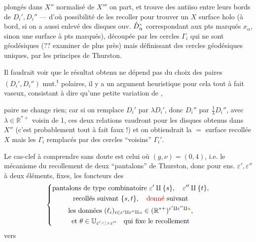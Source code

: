 plongés dans $X''$ normalisé de $X'''$  on
part, et  trouve des antiiso entre
leurs bords  de $D_i',D_i''$ ---
d'où possibilité de les recoller pour
trouver un $X$ surface holo (à bord,
si on a aussi enlevé des disques ouv.
$\mathring D_\alpha^{\unsure{*}}$ correspondant aux pts marqués $x_\alpha$,
sinon une surface à pts marqués),
découpée par les cercles $\Gamma_i$ qui ne
sont   géodésiques
($??$ 
examiner de plus près) mais définissant
des cercles géodésiques uniques,
par les principes de Thurston.

Il faudrait voir que le résultat
obtenu ne dépend pas du choix des
paires $(D_i',D_i'')$ mut.\textsuperscript{t} polaires, il y
a un argument heuristique pour
cela tout à fait vaseux, consistant
à dire qu'une petite variation de ,

paire ne change rien; car si on remplace
$D_i'$ par $\lambda D_i'$, donc $D_i''$ par $\frac1\lambda D_i''$, avec $\lambda\in\mathbb R^{*+}$
voisin de 1, ces deux relations vaudront
pour les disques obtenus dans  $X''$
(c'est probablement tout à fait faux !)
et on obtiendrait la $=$ surface recollée $X$
mais les $\Gamma_i$ remplacés par des cercles
``voisins'' $\Gamma_i'$.

Le cas-clef à comprendre sans
doute est celui où $(g,\nu)=(0,4)$,
i.e. le mécanisme du recollement
de deux ``pantalons'' de Thurston,
donc pour  ens. $\varepsilon',\varepsilon''$ à deux
éléments, fixes, les foncteurs des
\[
\left\{\begin{gathered}
\text{pantalons de type combinatoire }\varepsilon'\amalg\{s\},\quad\varepsilon''\amalg\{t\},\\
\text{recollés suivant }\{s,t\},\quad\deleted{\text{donné}}\ \text{suivant}\\
\text{les données }(\ell_i)_{i\in\varepsilon'\amalg\varepsilon''\amalg\unsure{u}}
\in(\mathbb R^{*+})^{\varepsilon'\amalg\varepsilon''\amalg\unsure{u}},\\
\text{et }\theta\in\mathbb U_{\varepsilon'\unsure{\wedge|\times}\varepsilon''}\quad\text{qui fixe le recollement}
\end{gathered}\right.
\]
vers


